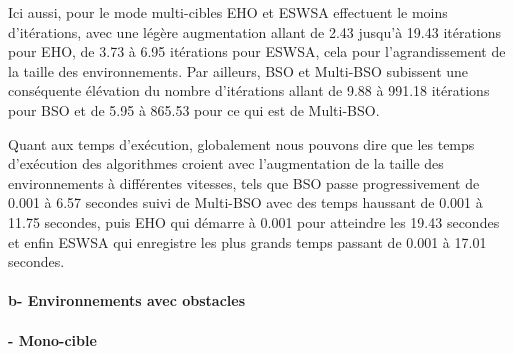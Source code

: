 	Ici aussi, pour le mode multi-cibles EHO et ESWSA effectuent le moins d'itérations, avec une légère augmentation allant de 2.43 jusqu'à 19.43 itérations pour EHO, de 3.73 à 6.95 itérations pour ESWSA, cela pour l'agrandissement de la taille des environnements.
	Par ailleurs, BSO et Multi-BSO subissent une conséquente élévation du nombre d'itérations allant de 9.88 à 991.18 itérations pour BSO et de 5.95 à 865.53 pour ce qui est de Multi-BSO.\\
	\vspace{-0.2cm}
	
	Quant aux temps d'exécution, globalement nous pouvons dire que les temps d'exécution des algorithmes croient avec l'augmentation de la taille des environnements à différentes vitesses, tels que BSO passe progressivement de 0.001 à 6.57 secondes suivi de Multi-BSO avec des temps haussant de 0.001 à 11.75 secondes, puis EHO qui démarre à 0.001 pour atteindre les 19.43 secondes et enfin ESWSA qui enregistre les plus grands temps passant de  0.001 à 17.01 secondes.
	
	
	
	\noindent
	\begin{minipage}[t]{0.55\textwidth}
		\hspace{-0.5cm}
		\captionsetup{width=0.8\linewidth}
		\centering{}
		\label{IS5}
	\end{minipage}\hfill
	\hspace{-0.5cm}
	\begin{minipage}[t]{0.55\textwidth}
		\captionsetup{width=0.8\linewidth}
		\centering{}
		\label{tS5}
	\end{minipage}\hfill
	
	\paragraph{b- Environnements avec obstacles}
	\textbf{}
	\noindent
	\paragraph{- Mono-cible}
	\textbf{ }
	
